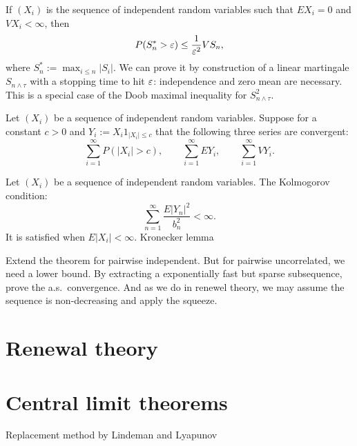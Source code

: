 \documentclass{../../large}
\begin{document}
\begin{prb}
If $(X_i)$ is the sequence of independent random variables such that $EX_i=0$ and $VX_i<\infty$, then
\[P(S^*_n>\varepsilon)\le\frac1{\varepsilon^2}VS_n,\]
where $S^*_n:=\max_{i\le n}|S_i|$.
We can prove it by construction of a linear martingale $S_{n\wedge\tau}$ with a stopping time to hit $\varepsilon$: independence and zero mean are necessary.
This is a special case of the Doob maximal inequality for $S_{n\wedge\tau}^2$.
\end{prb}


\begin{prb}
Let $(X_i)$ be a sequence of independent random variables.
Suppose for a constant $c>0$ and $Y_i:=X_i1_{|X_i|\le c}$  that the following three series are convergent:
\[\sum_{i=1}^\infty P(|X_i|>c),\qquad\sum_{i=1}^\infty EY_i,\qquad\sum_{i=1}^\infty VY_i.\]
\end{prb}

\begin{prb}
Let $(X_i)$ be a sequence of independent random variables.
The Kolmogorov condition:
\[\sum_{n=1}^\infty\frac{E|Y_n|^2}{b_n^2}<\infty.\]
It is satisfied when $E|X_i|<\infty$.
Kronecker lemma
\end{prb}


\begin{prb}
Extend the theorem for pairwise independent.
But for pairwise uncorrelated, we need a lower bound.
By extracting a exponentially fast but sparse subsequence, prove the a.s.~convergence.
And as we do in renewel theory, we may assume the sequence is non-decreasing and apply the squeeze.
\end{prb}

\section{Renewal theory}





\section{Central limit theorems}

\begin{prb}
Replacement method by Lindeman and Lyapunov
\end{prb}
\end{document}
